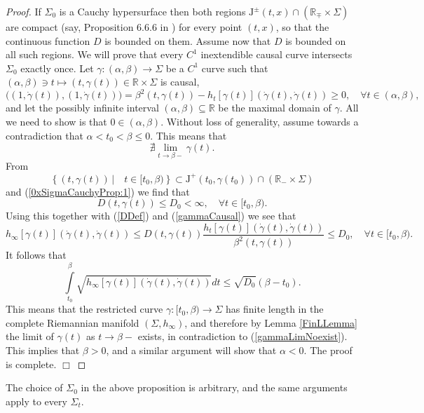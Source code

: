 \documentclass{article}
\begin{document}
\begin{proof} If $\Sigma_0$ is a Cauchy hypersurface then both regions $\mathrm{J}^\pm(t,x)\cap(\mathbb{R}_\mp\times\Sigma)$ are compact (say, Proposition 6.6.6 in \cite{HawkingEllis1973}) for every point $(t,x)$, so that the continuous function $D$ is bounded on them. Assume now that $D$ is bounded on all such regions. We will prove that every $C^1$ inextendible causal curve intersects $\Sigma_0$ exactly once. Let $\gamma:(\alpha,\beta)\to\Sigma$ be a $C^1$ curve such that $(\alpha,\beta)\ni t\mapsto(t,\gamma(t))\in\mathbb{R}\times\Sigma$ is causal,
\begin{equation}
[\beta^2\oplus-h_*]\bigl((1,\dot\gamma(t)),(1,\dot\gamma(t))\bigr)=\beta^2(t,\gamma(t))-h_t[\gamma(t)](\dot\gamma(t),\dot\gamma(t))\ge0,\quad\forall t\in(\alpha,\beta),\label{gammaCausal}
\end{equation}
and let the possibly infinite interval $(\alpha,\beta)\subseteq\mathbb{R}$ be the maximal domain of $\gamma$. All we need to show is that $0\in(\alpha,\beta)$. Without loss of generality, assume towards a contradiction that $\alpha<t_0<\beta\le0$. This means that
\begin{equation}
\nexists\lim\limits_{t\to\beta-}\gamma(t).\label{gammaLimNoexist}
\end{equation}
From
$$
\left\{(t,\gamma(t))\,{\big|}\quad t\in[t_0,\beta)\right\}\subset\mathrm{J}^+(t_0,\gamma(t_0))\cap(\mathbb{R}_-\times\Sigma)
$$
and (\ref{0xSigmaCauchyProp:1}) we find that
$$
D(t,\gamma(t))\le D_0<\infty,\quad\forall t\in[t_0,\beta).
$$
Using this together with (\ref{DDef}) and (\ref{gammaCausal}) we see that
$$
h_\infty[\gamma(t)](\dot\gamma(t),\dot\gamma(t))\le D(t,\gamma(t))\frac{h_t[\gamma(t)](\dot\gamma(t),\dot\gamma(t))}{\beta^2(t,\gamma(t))}\le D_0,\quad\forall t\in[t_0,\beta).
$$
It follows that
$$
\int\limits_{t_0}^\beta\sqrt{h_\infty[\gamma(t)](\dot\gamma(t),\dot\gamma(t))}dt\le\sqrt{D_0}(\beta-t_0).
$$
This means that the restricted curve $\gamma:[t_0,\beta)\to\Sigma$ has finite length in the complete Riemannian manifold $(\Sigma,h_\infty)$, and therefore by Lemma \ref{FinLLemma} the limit of $\gamma(t)$ as $t\to\beta-$ exists, in contradiction to (\ref{gammaLimNoexist}). This implies that $\beta>0$, and a similar argument will show that $\alpha<0$. The proof is complete. $\Box$
\end{proof}

\begin{remark} The choice of $\Sigma_0$ in the above proposition is arbitrary, and the same arguments apply to every $\Sigma_t$.
\end{remark}
\end{document}

